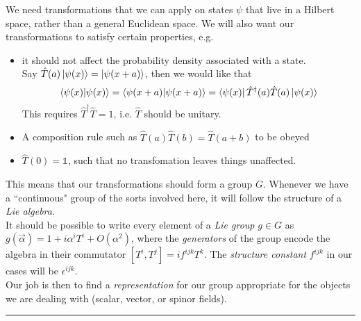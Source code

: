 \documentclass[11pt]{article}
\begin{document}
	\noindent {\textcolor{VioletRed}{\large \bf My understanding:}}
	{\color{darkgray}
		We need transformations that we can apply on states $\psi$ that live in a Hilbert space, rather than a general Euclidean space. We will also want our transformations to satisfy certain properties, e.g. 
		\vspace{-4pt}
		\begin{itemize}
			\item it should not affect the probability density associated with a state.\\
			 Say $\hat{T}(a) \ket{\psi(x)} = \ket{\psi(x+a)}$, then we would like that  %
			 $$\bra{\psi(x)}\ket{\psi(x)} = \bra{\psi(x+a)}\ket{\psi(x+a)} = \bra{\psi(x)}\hat{T}^\dagger(a)\hat{T}(a)\ket{\psi(x)}$$
			 This requires $\hat{T}^\dagger\hat{T} = 1$, i.e. $\hat{T}$ should be unitary.
			 \vspace{-6pt}
			 \item A composition rule such as $\hat{T}(a)\hat{T}(b) = \hat{T}(a+b)$ to be obeyed
			 \vspace{-6pt}
			 \item $\hat{T}(0) = \mathbb{1}$, such that no transfomation leaves things unaffected.
		\end{itemize}
	\vspace{-4pt}
	This means that our transformations should form a group $G$. Whenever we have a ``continuous" group of the sorts involved here, it will follow the structure of a \textit{Lie algebra}. \vspace{4pt} \\
	It should be possible to write every element of a \textit{Lie group} $g \in G$ as $g(\vec{\alpha}) = 1 + i\alpha^i T^i + O(\alpha^2)$, where the \textit{generators} of the group encode the algebra in their commutator
	 $[T^i, T^j] = i f^{ijk} T^k$. The \textit{structure constant} $f^{ijk}$ in our cases will be $\epsilon^{ijk}$.\vspace{4pt} \\ Our job is then to find a \textit{representation} for our group appropriate for the objects we are dealing with (scalar, vector, or spinor fields).
	}

	{\hfill \color{VioletRed} \rule{0.5\textwidth}{0.4pt} \hfill }\\
	\vspace{-24pt}
\end{document}
